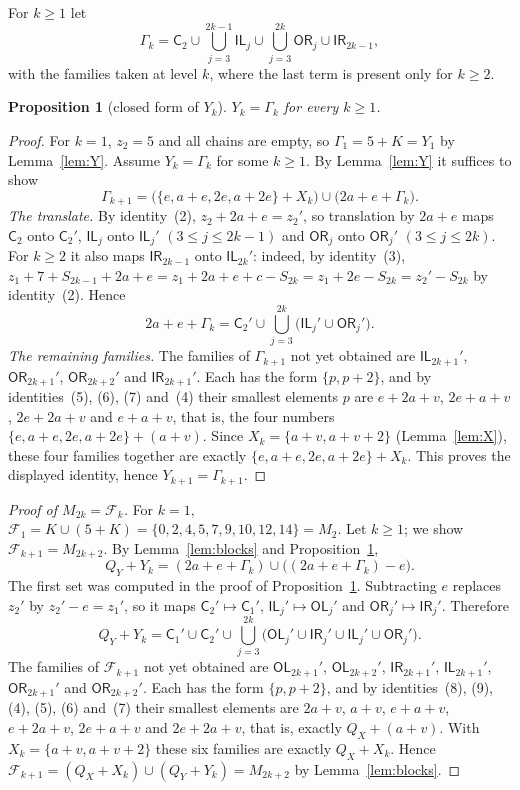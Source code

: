 \documentclass[11pt]{amsart}
\newtheorem{proposition}[lemma]{Proposition}
\theoremstyle{definition}
\theoremstyle{remark}
\theoremstyle{plain}
\numberwithin{equation}{section}
\newcommand{\CC}{\mathsf{C}}
\newcommand{\OL}{\mathsf{OL}}
\newcommand{\OR}{\mathsf{OR}}
\newcommand{\IL}{\mathsf{IL}}
\newcommand{\IR}{\mathsf{IR}}
\newcommand{\Fam}{\mathcal{F}}
\begin{document}
For $k\ge1$ let
\[
\Gamma_k=\CC_2\cup\bigcup_{j=3}^{2k-1}\IL_j\cup\bigcup_{j=3}^{2k}\OR_j\cup\IR_{2k-1},
\]
with the families taken at level $k$, where the last term is present only for $k\ge2$.

\begin{proposition}[closed form of $Y_k$]\label{prop:Yclosed}
$Y_k=\Gamma_k$ for every $k\ge1$.
\end{proposition}

\begin{proof}
For $k=1$, $z_2=5$ and all chains are empty, so $\Gamma_1=5+K=Y_1$ by Lemma~\ref{lem:Y}. Assume
$Y_k=\Gamma_k$ for some $k\ge1$. By Lemma~\ref{lem:Y} it suffices to show
\[
\Gamma_{k+1}=\bigl(\{e,a+e,2e,a+2e\}+X_k\bigr)\cup\bigl(2a+e+\Gamma_k\bigr).
\]
\emph{The translate.} By identity~(2), $z_2+2a+e=z_2'$, so translation by $2a+e$ maps $\CC_2$ onto
$\CC_2'$, $\IL_j$ onto $\IL_j'$ $(3\le j\le2k-1)$ and $\OR_j$ onto $\OR_j'$ $(3\le j\le2k)$. For
$k\ge2$ it also maps $\IR_{2k-1}$ onto $\IL_{2k}'$: indeed, by identity~(3),
$z_1+7+S_{2k-1}+2a+e=z_1+2a+e+c-S_{2k}=z_1+2e-S_{2k}=z_2'-S_{2k}$ by identity~(2). Hence
\[
2a+e+\Gamma_k=\CC_2'\cup\bigcup_{j=3}^{2k}\bigl(\IL_j'\cup\OR_j'\bigr).
\]
\emph{The remaining families.} The families of $\Gamma_{k+1}$ not yet obtained are $\IL_{2k+1}'$,
$\OR_{2k+1}'$, $\OR_{2k+2}'$ and $\IR_{2k+1}'$. Each has the form $\{p,p+2\}$, and by
identities~(5), (6), (7) and~(4) their smallest elements $p$ are $e+2a+v$, $2e+a+v$, $2e+2a+v$
and $e+a+v$, that is, the four numbers $\{e,a+e,2e,a+2e\}+(a+v)$. Since $X_k=\{a+v,a+v+2\}$
(Lemma~\ref{lem:X}), these four families together are exactly $\{e,a+e,2e,a+2e\}+X_k$. This proves
the displayed identity, hence $Y_{k+1}=\Gamma_{k+1}$.
\end{proof}

\begin{proof}[Proof of $M_{2k}=\Fam_k$]
For $k=1$, $\Fam_1=K\cup(5+K)=\{0,2,4,5,7,9,10,12,14\}=M_2$. Let $k\ge1$; we show
$\Fam_{k+1}=M_{2k+2}$. By Lemma~\ref{lem:blocks} and Proposition~\ref{prop:Yclosed},
\[
Q_Y+Y_k=(2a+e+\Gamma_k)\cup\bigl((2a+e+\Gamma_k)-e\bigr).
\]
The first set was computed in the proof of Proposition~\ref{prop:Yclosed}. Subtracting $e$ replaces
$z_2'$ by $z_2'-e=z_1'$, so it maps $\CC_2'\mapsto\CC_1'$, $\IL_j'\mapsto\OL_j'$ and
$\OR_j'\mapsto\IR_j'$. Therefore
\[
Q_Y+Y_k=\CC_1'\cup\CC_2'\cup\bigcup_{j=3}^{2k}\bigl(\OL_j'\cup\IR_j'\cup\IL_j'\cup\OR_j'\bigr).
\]
The families of $\Fam_{k+1}$ not yet obtained are $\OL_{2k+1}'$, $\OL_{2k+2}'$, $\IR_{2k+1}'$,
$\IL_{2k+1}'$, $\OR_{2k+1}'$ and $\OR_{2k+2}'$. Each has the form $\{p,p+2\}$, and by
identities~(8), (9), (4), (5), (6) and~(7) their smallest elements are
$2a+v$, $a+v$, $e+a+v$, $e+2a+v$, $2e+a+v$ and $2e+2a+v$, that is, exactly $Q_X+(a+v)$. With
$X_k=\{a+v,a+v+2\}$ these six families are exactly $Q_X+X_k$. Hence
$\Fam_{k+1}=(Q_X+X_k)\cup(Q_Y+Y_k)=M_{2k+2}$ by Lemma~\ref{lem:blocks}.
\end{proof}
\end{document}
